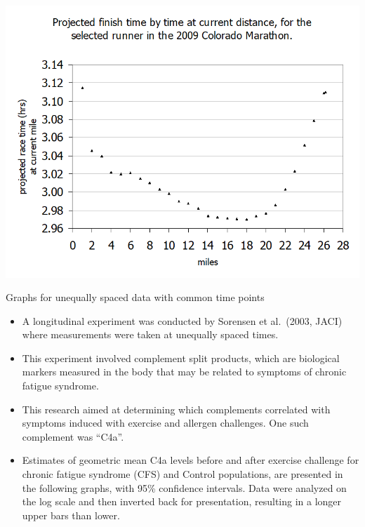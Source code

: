 \documentclass[
  9pt,
  ignorenonframetext,
]{beamer}
\begin{document}
\begin{frame}{}
\protect\hypertarget{section-8}{}
\tiny

\begin{center}\includegraphics[width=0.6\linewidth]{figs_L2/L2-f12} \end{center}

\tiny
\end{frame}

\begin{frame}{Graphs for unequally spaced data with common time points}
\protect\hypertarget{graphs-for-unequally-spaced-data-with-common-time-points}{}
\begin{itemize}
\item
  A longitudinal experiment was conducted by Sorensen et al.~(2003,
  JACI) where measurements were taken at unequally spaced times.
\item
  This experiment involved complement split products, which are
  biological markers measured in the body that may be related to
  symptoms of chronic fatigue syndrome.
\item
  This research aimed at determining which complements correlated with
  symptoms induced with exercise and allergen challenges. One such
  complement was ``C4a''.
\item
  Estimates of geometric mean C4a levels before and after exercise
  challenge for chronic fatigue syndrome (CFS) and Control populations,
  are presented in the following graphs, with 95\% confidence intervals.
  Data were analyzed on the log scale and then inverted back for
  presentation, resulting in a longer upper bars than lower. 
\end{itemize}
\end{frame}
\end{document}
